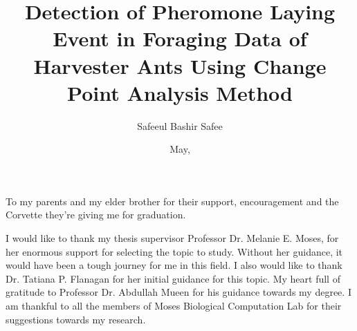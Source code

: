\documentclass[botnum, fleqn]{unmeethesis}
\begin{document}
\frontmatter




\title{Detection of Pheromone Laying Event in Foraging Data of Harvester Ants Using Change Point Analysis Method}

\author{Safeeul Bashir Safee}





\date{May, \thisyear}

\maketitle


\begin{dedication}
   To my parents and my elder brother for their support,
   encouragement and the Corvette they're giving me for graduation. \\[3ex]
\end{dedication}

\begin{acknowledgments}
   \vspace{1.1in}
  I would like to thank my thesis supervisor Professor Dr. Melanie E. Moses, for her enormous support for selecting the topic to study. Without her guidance, it would have been a tough journey for me in this field. I also would like to thank Dr. Tatiana P. Flanagan for her initial guidance for this topic. My heart full of gratitude to Professor Dr. Abdullah Mueen for his guidance towards my degree. 
  I am thankful to all the members of Moses Biological Computation Lab for their suggestions towards my research. 
\end{acknowledgments}

\maketitleabstract %
\end{document}
